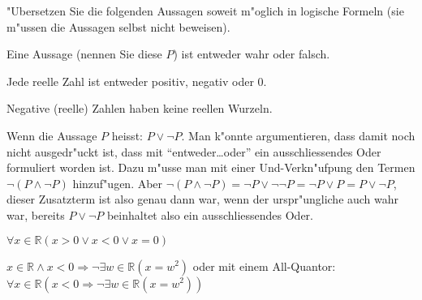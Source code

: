 "Ubersetzen Sie die folgenden Aussagen soweit m"oglich in
logische Formeln (sie m"ussen die Aussagen selbst nicht beweisen).
\begin{teilaufgaben}
\item Eine Aussage (nennen Sie diese $P$) ist entweder wahr oder falsch.
\item Jede reelle Zahl ist entweder positiv, negativ oder $0$.
\item Negative (reelle) Zahlen haben keine reellen Wurzeln.
\end{teilaufgaben}

\begin{loesung}
\begin{teilaufgaben}
\item Wenn die Aussage $P$ heisst: $P\vee\neg P$.
Man k"onnte argumentieren, dass damit noch nicht ausgedr"uckt ist,
dass mit ``entweder\dots oder'' ein ausschliessendes Oder formuliert
worden ist. Dazu m"usse man mit einer Und-Verkn"ufpung den Termen
$\neg(P\wedge \neg P)$
hinzuf"ugen. Aber
$\neg(P\wedge \neg P)=\neg P\vee \neg\neg P=\neg P\vee P=P\vee\neg P$,
dieser Zusatzterm ist also genau dann war, wenn der urspr"ungliche
auch wahr war, bereits $P\vee \neg P$ beinhaltet also ein ausschliessendes
Oder.
\item $\forall x\in\mathbb R(x > 0\vee x<0\vee x=0)$
\item $x\in\mathbb R\wedge x < 0\Rightarrow
\neg\exists w\in\mathbb R(x=w^2)$
oder mit einem All-Quantor: $\forall x\in\mathbb R(x<0\Rightarrow
\neg\exists w\in\mathbb R(x=w^2))$
\qedhere
\end{teilaufgaben}
\end{loesung}

